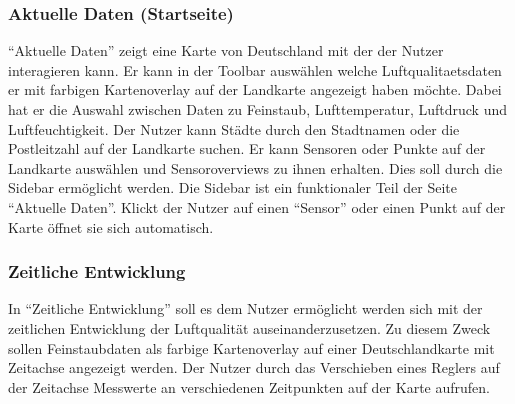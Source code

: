 \subsubsection{Aktuelle Daten (Startseite)}

\enquote{Aktuelle Daten} zeigt eine Karte von Deutschland mit der der Nutzer interagieren kann. 
Er kann in der Toolbar auswählen welche \gls{Luftqualitaetsdaten} er mit farbigen Kartenoverlay auf der Landkarte angezeigt haben möchte. 
Dabei hat er die Auswahl zwischen Daten zu \gls{Feinstaub}, Lufttemperatur, Luftdruck und Luftfeuchtigkeit.
Der Nutzer kann Städte durch den Stadtnamen oder die Postleitzahl auf der Landkarte suchen. Er kann Sensoren oder Punkte auf der Landkarte auswählen und Sensoroverviews zu ihnen erhalten. Dies soll durch die \gls{Sidebar} ermöglicht werden.
Die \gls{Sidebar} ist ein funktionaler Teil der Seite \enquote{Aktuelle Daten}. Klickt der Nutzer auf einen \enquote{Sensor} oder einen Punkt auf der Karte öffnet sie sich automatisch.



\subsubsection{Zeitliche Entwicklung}

In \enquote{Zeitliche Entwicklung} soll es dem Nutzer ermöglicht werden sich mit der zeitlichen Entwicklung der Luftqualität auseinanderzusetzen. 
Zu diesem Zweck sollen Feinstaubdaten als farbige Kartenoverlay auf einer Deutschlandkarte mit Zeitachse angezeigt werden. 
Der Nutzer durch das Verschieben eines Reglers auf der Zeitachse Messwerte an verschiedenen Zeitpunkten auf der Karte aufrufen.


